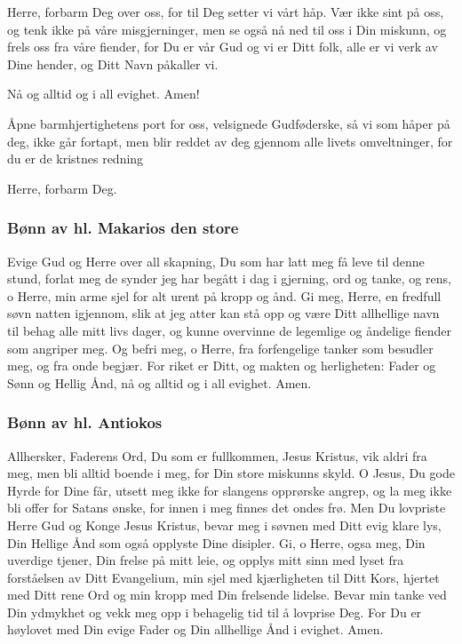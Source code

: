 Herre, forbarm Deg over oss, for til Deg setter vi vårt håp. Vær ikke sint på oss, og tenk ikke på våre misgjerninger, men se også nå ned til oss i Din miskunn, og frels oss fra våre fiender, for Du er vår Gud og vi er Ditt folk, alle er vi verk av Dine hender, og Ditt Navn påkaller vi.

Nå og alltid og i all evighet. Amen!

Åpne barmhjertighetens port for oss, velsignede Gudføderske, så vi som håper på deg, ikke går fortapt, men blir reddet av deg gjennom alle livets omveltninger, for du er de kristnes redning

Herre, forbarm Deg. 

\subsubsection{Bønn av hl. Makarios den store}

Evige Gud og Herre over all skapning, Du som har latt meg få leve til denne stund, forlat meg de synder jeg har begått i dag i gjerning, ord og tanke, og rens, o Herre, min arme sjel for alt urent på kropp og ånd. Gi meg, Herre, en fredfull søvn natten igjennom, slik at jeg atter kan stå opp og være Ditt allhellige navn til behag alle mitt livs dager, og kunne overvinne de legemlige og åndelige fiender som angriper meg. Og befri meg, o Herre, fra forfengelige tanker som besudler meg, og fra onde begjær. For riket er Ditt, og makten og herligheten: Fader og Sønn og Hellig Ånd, nå og alltid og i all evighet. Amen.

\subsubsection{Bønn av hl. Antiokos}

Allhersker, Faderens Ord, Du som er fullkommen, Jesus Kristus, vik aldri fra meg, men bli alltid boende i meg, for Din store miskunns skyld. O Jesus, Du gode Hyrde for Dine får, utsett meg ikke for slangens opprørske angrep, og la meg ikke bli offer for Satans ønske, for innen i meg finnes det ondes frø. Men Du lovpriste Herre Gud og Konge Jesus Kristus, bevar meg i søvnen med Ditt evig klare lys, Din Hellige Ånd som også opplyste Dine disipler. Gi, o Herre, ogsa meg, Din uverdige tjener, Din frelse på mitt leie, og opplys mitt sinn med lyset fra forståelsen av Ditt Evangelium, min sjel med kjærligheten til Ditt Kors, hjertet med Ditt rene Ord og min kropp med Din frelsende lidelse. Bevar min tanke ved Din ydmykhet og vekk meg opp i behagelig tid til å lovprise Deg. For Du er høylovet med Din evige Fader og Din allhellige Ånd i evighet. Amen.

